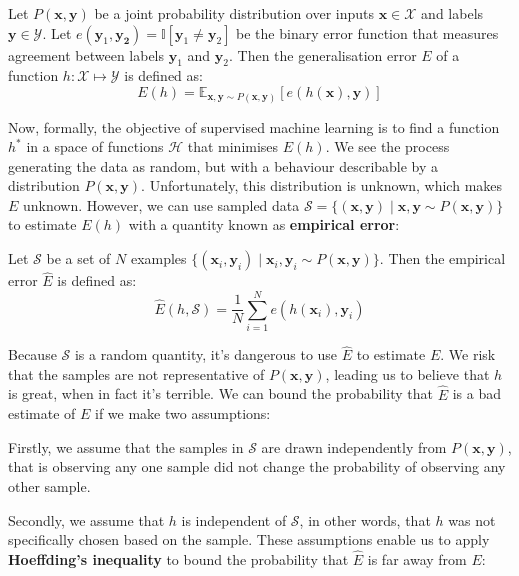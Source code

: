 \begin{definition} \label{generalisation_error}
	Let $P(\mathbf{x}, \mathbf{y})$ be a joint probability distribution over inputs $\mathbf{x} \in \mathcal{X}$ and labels $\mathbf{y} \in \mathcal{Y}$. Let $e(\mathbf{y}_1, \mathbf{y_2}) = \mathbb{I}[\mathbf{y}_1 \neq \mathbf{y}_2]$ be the binary error function that measures agreement between labels $\mathbf{y}_1$ and $\mathbf{y}_2$. Then the generalisation error $E$ of a function $h: \mathcal{X} \mapsto \mathcal{Y}$ is defined as:
	$$
		E(h) = \mathbb{E}_{\mathbf{x},\mathbf{y}\sim P(\mathbf{x}, \mathbf{y})}[e(h(\mathbf{x}), \mathbf{y})]
	$$
\end{definition}
Now, formally, the objective of supervised machine learning is to find a function $h^*$ in a space of functions $\mathcal{H}$ that minimises $E(h)$. We see the process generating the data as random, but with a behaviour describable by a distribution $P(\mathbf{x}, \mathbf{y})$. Unfortunately, this distribution is unknown, which makes $E$ unknown. However, we can use sampled data $\mathcal{S} = \{(\mathbf{x}, \mathbf{y}) \mid \mathbf{x}, \mathbf{y} \sim P(\mathbf{x}, \mathbf{y})\}$ to estimate $E(h)$ with a quantity known as \textbf{empirical error}:

\begin{definition} \label{empirical_error}
	Let $\mathcal{S}$ be a set of $N$ examples $\{(\mathbf{x}_i, \mathbf{y}_i) \mid \mathbf{x}_i, \mathbf{y}_i \sim P(\mathbf{x}, \mathbf{y})\}$. Then the empirical error $\hat{E}$ is defined as:
	$$
		\hat{E}(h, \mathcal{S}) = \frac{1}{N}\sum\limits_{i=1}^N e(h(\mathbf{x}_i), \mathbf{y}_i)
	$$
\end{definition}

Because $\mathcal{S}$ is a random quantity, it's dangerous to use $\hat{E}$ to estimate $E$. We risk that the samples are not representative of $P(\mathbf{x}, \mathbf{y})$, leading us to believe that $h$ is great, when in fact it's terrible. We can bound the probability that $\hat{E}$ is a bad estimate of $E$ if we make two assumptions:

Firstly, we assume that the samples in $\mathcal{S}$ are drawn independently from $P(\mathbf{x}, \mathbf{y})$, that is observing any one sample did not change the probability of observing any other sample.

Secondly, we assume that $h$ is independent of $\mathcal{S}$, in other words, that $h$ was not specifically chosen based on the sample. These assumptions enable us to apply \textbf{Hoeffding's inequality} to bound the probability that $\hat{E}$ is far away from $E$:

